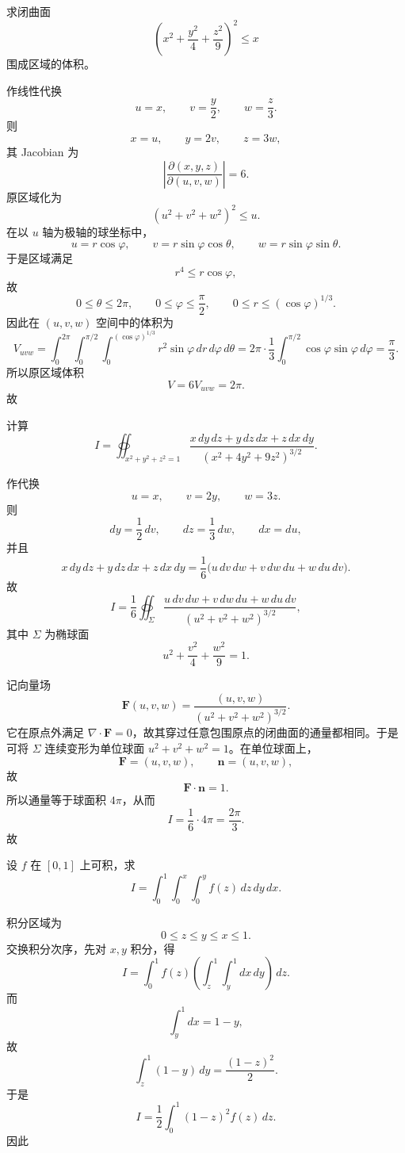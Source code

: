 \begin{question}[求体积]

求闭曲面
\[
\left(x^2+\frac{y^2}{4}+\frac{z^2}{9}\right)^2\le x
\]
围成区域的体积。

\begin{solution}
作线性代换
\[
u=x,\qquad v=\frac y2,\qquad w=\frac z3.
\]
则
\[
x=u,\qquad y=2v,\qquad z=3w,
\]
其 Jacobian 为
\[
\left|\frac{\partial(x,y,z)}{\partial(u,v,w)}\right|=6.
\]
原区域化为
\[
(u^2+v^2+w^2)^2\le u.
\]
在以 $u$ 轴为极轴的球坐标中，
\[
u=r\cos\varphi,\qquad
v=r\sin\varphi\cos\theta,\qquad
w=r\sin\varphi\sin\theta.
\]
于是区域满足
\[
r^4\le r\cos\varphi,
\]
故
\[
0\le \theta\le 2\pi,\qquad
0\le \varphi\le \frac{\pi}{2},\qquad
0\le r\le (\cos\varphi)^{1/3}.
\]
因此在 $(u,v,w)$ 空间中的体积为
\[
V_{uvw}
=\int_0^{2\pi}\!\int_0^{\pi/2}\!\int_0^{(\cos\varphi)^{1/3}}r^2\sin\varphi\,dr\,d\varphi\,d\theta
=2\pi\cdot\frac13\int_0^{\pi/2}\cos\varphi\sin\varphi\,d\varphi
=\frac{\pi}{3}.
\]
所以原区域体积
\[
V=6V_{uvw}=2\pi.
\]
故
\end{solution}
\end{question}

\begin{question}[曲面积分]

计算
\[
I=\oiint_{x^2+y^2+z^2=1}\frac{x\,dy\,dz+y\,dz\,dx+z\,dx\,dy}{(x^2+4y^2+9z^2)^{3/2}}.
\]

\begin{solution}
作代换
\[
u=x,\qquad v=2y,\qquad w=3z.
\]
则
\[
dy=\frac12\,dv,\qquad dz=\frac13\,dw,\qquad dx=du,
\]
并且
\[
x\,dy\,dz+y\,dz\,dx+z\,dx\,dy
=\frac16\bigl(u\,dv\,dw+v\,dw\,du+w\,du\,dv\bigr).
\]
故
\[
I=\frac16\oiint_{\Sigma}\frac{u\,dv\,dw+v\,dw\,du+w\,du\,dv}{(u^2+v^2+w^2)^{3/2}},
\]
其中 $\Sigma$ 为椭球面
\[
u^2+\frac{v^2}{4}+\frac{w^2}{9}=1.
\]

记向量场
\[
\mathbf F(u,v,w)=\frac{(u,v,w)}{(u^2+v^2+w^2)^{3/2}}.
\]
它在原点外满足 $\nabla\cdot\mathbf F=0$，故其穿过任意包围原点的闭曲面的通量都相同。于是可将 $\Sigma$ 连续变形为单位球面 $u^2+v^2+w^2=1$。在单位球面上，
\[
\mathbf F=(u,v,w),\qquad \mathbf n=(u,v,w),
\]
故
\[
\mathbf F\cdot\mathbf n=1.
\]
所以通量等于球面积 $4\pi$，从而
\[
I=\frac16\cdot4\pi=\frac{2\pi}{3}.
\]
故
\end{solution}
\end{question}

\begin{question}[三重积分换序]

设 $f$ 在 $[0,1]$ 上可积，求
\[
I=\int_0^1\int_0^x\int_0^y f(z)\,dz\,dy\,dx.
\]

\begin{solution}
积分区域为
\[
0\le z\le y\le x\le1.
\]
交换积分次序，先对 $x,y$ 积分，得
\[
I=\int_0^1 f(z)\left(\int_z^1\int_y^1 dx\,dy\right)\,dz.
\]
而
\[
\int_y^1 dx=1-y,
\]
故
\[
\int_z^1(1-y)\,dy=\frac{(1-z)^2}{2}.
\]
于是
\[
I=\frac12\int_0^1(1-z)^2f(z)\,dz.
\]
因此
\end{solution}
\end{question}

